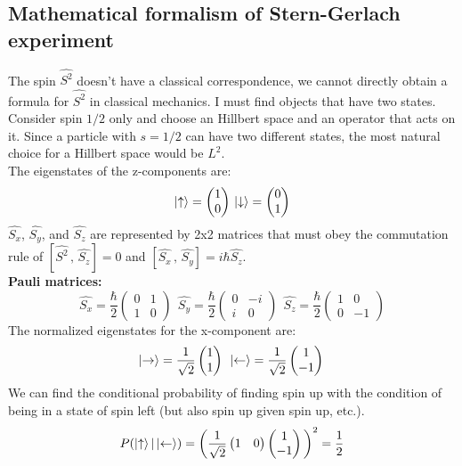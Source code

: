 \subsection{Mathematical formalism of Stern-Gerlach experiment}
The spin $\hat{S^2}$ doesn't have a classical correspondence, we cannot directly obtain a formula for $\hat{S^2}$ in classical mechanics. I must find objects that have two states.\\
Consider spin $1/2$ only and choose an Hillbert space and an operator that acts on it. Since a particle with $s=1/2$ can have two different states, the most natural choice for a Hillbert space would be \emph{$L^2$}.\\
The eigenstates of the z-components are:
\[\ket{\uparrow}=\begin{pmatrix}1\\0\end{pmatrix}\, \ket{\downarrow}=\begin{pmatrix}0\\1\end{pmatrix}\]
$\hat{S_x}$, $\hat{S_y}$, and $\hat{S_z}$ are represented by 2x2 matrices that must obey the commutation rule of $[\hat{S^2}\,,\,\hat{S_z}]=0$ and $[\hat{S_x}\,,\,\hat{S_y}]=i\hbar\hat{S_z}$.
\\
\textbf{Pauli matrices:}
\[
\hat{S_x}=\frac{\hbar}{2}\begin{pmatrix}0&1\\1&0\end{pmatrix}\;\,
\hat{S_y}=\frac{\hbar}{2}\begin{pmatrix}0&-i\\i&0\end{pmatrix}\;\,
\hat{S_z}=\frac{\hbar}{2}\begin{pmatrix}1&0\\0&-1\end{pmatrix}
\]
The normalized eigenstates for the x-component are:
\[
\ket{\rightarrow}=\frac{1}{\sqrt{2}}\begin{pmatrix}1\\1\end{pmatrix}\;\,
\ket{\leftarrow}=\frac{1}{\sqrt{2}}\begin{pmatrix}1\\-1\end{pmatrix}\,
\]
We can find the conditional probability of finding spin up with the condition of being in a state of spin left (but also spin up given spin up, etc.).
\[
P(\ket{\uparrow}|\ket{\leftarrow})=\bigg(\frac{1}{\sqrt{2}}\begin{pmatrix}1&0\end{pmatrix}\begin{pmatrix}1\\-1\end{pmatrix}\bigg)^2=\frac{1}{2}
\]
